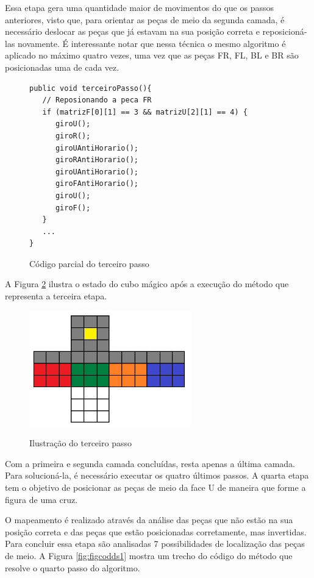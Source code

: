 Essa etapa gera uma quantidade maior de movimentos do que os passos anteriores, visto que, para orientar as peças de meio da segunda camada, é necessário deslocar as peças que já estavam na sua posição correta e reposicioná-las novamente. É interessante notar que nessa técnica o mesmo algoritmo é aplicado no máximo quatro vezes, uma vez que as peças FR, FL, BL e BR são posicionadas uma de cada vez. 



\begin{figure}[!htb]
\begin{lstlisting}
public void terceiroPasso(){
   // Reposionando a peca FR
   if (matrizF[0][1] == 3 && matrizU[2][1] == 4) {
      giroU();
      giroR();
      giroUAntiHorario();
      giroRAntiHorario();
      giroUAntiHorario();
      giroFAntiHorario();
      giroU();
      giroF();
   }
   ...
}
\end{lstlisting}
\caption{Código parcial do terceiro passo}
\label{fig:figcoood1}
\end{figure}


A Figura \ref{fig:terceiroPasso} ilustra o estado do cubo mágico após a execução do método que representa a terceira etapa.

\begin{figure}[!htb]
    \centering
    {
        \includegraphics[height=5cm]{imagens/terceiropasso.jpg}
        \label{figFront}
    }
    
\caption{Ilustração do terceiro passo}
\label{fig:terceiroPasso}
\end{figure}


Com a primeira e segunda camada concluídas, resta apenas a última camada. Para solucioná-la, é necessário executar os quatro últimos passos. A quarta etapa tem o objetivo de posicionar as peças de meio da face U de maneira que forme a figura de uma cruz.

O mapeamento é realizado através da análise das peças que não estão na sua posição correta e das peças que estão posicionadas corretamente, mas invertidas. Para concluir essa etapa são analisadas 7 possibilidades de localização das peças de meio. A Figura \ref{fig:figcodds1} mostra um trecho do código do método que resolve o quarto passo do algoritmo.



